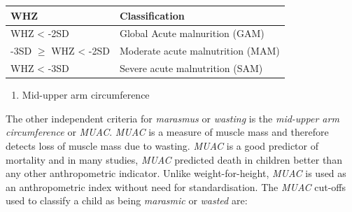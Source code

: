 \documentclass[12pt,]{book}
\providecommand{\tightlist}{%
  \setlength{\itemsep}{0pt}\setlength{\parskip}{0pt}}
\theoremstyle{definition}
\theoremstyle{definition}
\theoremstyle{definition}
\theoremstyle{remark}
\begin{document}
\begin{longtable}[]{@{}ll@{}}
\toprule
\begin{minipage}[b]{0.34\columnwidth}\raggedright
\textbf{WHZ}\strut
\end{minipage} & \begin{minipage}[b]{0.47\columnwidth}\raggedright
\textbf{Classification}\strut
\end{minipage}\tabularnewline
\midrule
\endhead
\begin{minipage}[t]{0.34\columnwidth}\raggedright
WHZ \textless{} -2SD\strut
\end{minipage} & \begin{minipage}[t]{0.47\columnwidth}\raggedright
Global Acute malnurition (GAM)\strut
\end{minipage}\tabularnewline
\begin{minipage}[t]{0.34\columnwidth}\raggedright
-3SD \(\geq\) WHZ \textless{} -2SD\strut
\end{minipage} & \begin{minipage}[t]{0.47\columnwidth}\raggedright
Moderate acute malnutrition (MAM)\strut
\end{minipage}\tabularnewline
\begin{minipage}[t]{0.34\columnwidth}\raggedright
WHZ \textless{} -3SD\strut
\end{minipage} & \begin{minipage}[t]{0.47\columnwidth}\raggedright
Severe acute malnutrition (SAM)\strut
\end{minipage}\tabularnewline
\bottomrule
\end{longtable}

\begin{enumerate}
\def\labelenumi{\arabic{enumi}.}
\setcounter{enumi}{1}
\tightlist
\item
  Mid-upper arm circumference
\end{enumerate}

The other independent criteria for \emph{marasmus} or \emph{wasting} is
the \emph{mid-upper arm circumference} or \emph{MUAC}. \emph{MUAC} is a
measure of muscle mass and therefore detects loss of muscle mass due to
wasting. \emph{MUAC} is a good predictor of mortality and in many
studies, \emph{MUAC} predicted death in children better than any other
anthropometric indicator. Unlike weight-for-height, \emph{MUAC} is used
as an anthropometric index without need for standardisation. The
\emph{MUAC} cut-offs used to classify a child as being \emph{marasmic}
or \emph{wasted} are:
\end{document}
